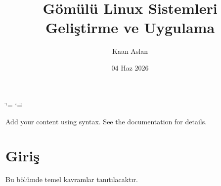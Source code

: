 \documentclass[letterpaper,10pt,turkish]{sphinxmanual}
\title{Gömülü Linux Sistemleri \sphinxhyphen{} Geliştirme ve Uygulama}
\date{04 Haz 2026}
\author{Kaan Aslan}
\begin{document}
\ifdefined\shorthandoff
  \ifnum\catcode`\=\string=\active\shorthandoff{=}\fi
  \ifnum\catcode`\"=\active{}\fi
\fi

\pagestyle{empty}
\sphinxmaketitle
\pagestyle{plain}
\sphinxtableofcontents
\pagestyle{normal}
\label{\detokenize{index::doc}}


\sphinxAtStartPar
Add your content using  syntax. See the
documentation for details.

\sphinxstepscope


\chapter{Giriş}
\label{\detokenize{introduction:giris}}\label{\detokenize{introduction::doc}}
\sphinxAtStartPar
Bu bölümde temel kavramlar tanıtılacaktır.
\end{document}
